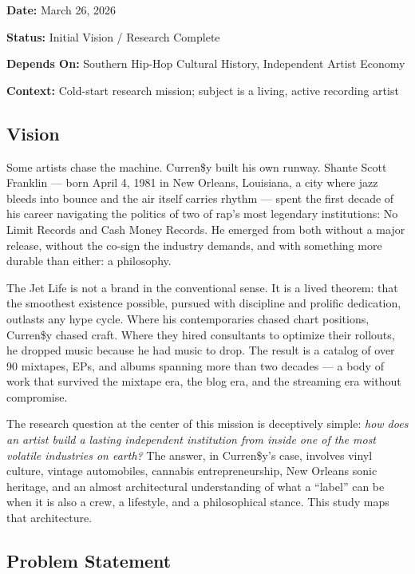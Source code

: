 \documentclass[11pt,letterpaper]{article}
\newcommand{\metafield}[2]{\textbf{\sffamily #1} #2\par}
\begin{document}
\metafield{Date:}{March 26, 2026}
\metafield{Status:}{Initial Vision / Research Complete}
\metafield{Depends On:}{Southern Hip-Hop Cultural History, Independent Artist Economy}
\metafield{Context:}{Cold-start research mission; subject is a living, active recording artist}

\subsection{Vision}

Some artists chase the machine. Curren\$y built his own runway. Shante Scott Franklin — born April 4, 1981 in New Orleans, Louisiana, a city where jazz bleeds into bounce and the air itself carries rhythm — spent the first decade of his career navigating the politics of two of rap's most legendary institutions: No Limit Records and Cash Money Records. He emerged from both without a major release, without the co-sign the industry demands, and with something more durable than either: a philosophy.

The Jet Life is not a brand in the conventional sense. It is a lived theorem: that the smoothest existence possible, pursued with discipline and prolific dedication, outlasts any hype cycle. Where his contemporaries chased chart positions, Curren\$y chased craft. Where they hired consultants to optimize their rollouts, he dropped music because he had music to drop. The result is a catalog of over 90 mixtapes, EPs, and albums spanning more than two decades — a body of work that survived the mixtape era, the blog era, and the streaming era without compromise.

The research question at the center of this mission is deceptively simple: \textit{how does an artist build a lasting independent institution from inside one of the most volatile industries on earth?} The answer, in Curren\$y's case, involves vinyl culture, vintage automobiles, cannabis entrepreneurship, New Orleans sonic heritage, and an almost architectural understanding of what a ``label'' can be when it is also a crew, a lifestyle, and a philosophical stance. This study maps that architecture.

\subsection{Problem Statement}
\end{document}
